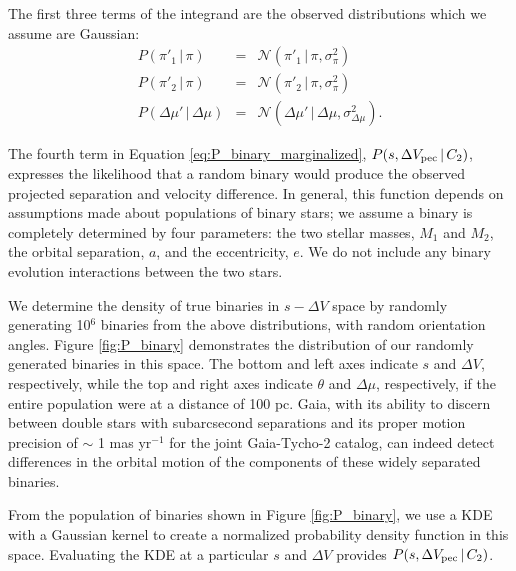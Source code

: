 \documentclass[usenatbib]{mnras}
\newcommand{\given}{\,|\,}
\begin{document}
The first three terms of the integrand are the observed distributions which we assume are Gaussian:
\begin{eqnarray}
P(\pi'_1 \given \pi) &=& \mathcal{N}(\pi'_1 \given \pi, \sigma^2_{\pi}) \\
P(\pi'_2 \given \pi) &=& \mathcal{N}(\pi'_2 \given \pi, \sigma^2_{\pi}) \\
P(\Delta \mu' \given \Delta \mu) &=& \mathcal{N}( \Delta \mu' \given \Delta \mu, \sigma^2_{\Delta \mu} ).
\end{eqnarray}



The fourth term in Equation \ref{eq:P_binary_marginalized}, $P(s, \Delta V_{\rm pec} \given C_2)$, expresses the likelihood that a random binary would produce the observed projected separation and velocity difference. In general, this function depends on assumptions made about populations of binary stars; we assume a binary is completely determined by four parameters: the two stellar masses, $M_1$ and $M_2$, the orbital separation, $a$, and the eccentricity, $e$. We do not include any binary evolution interactions between the two stars. 


We determine the density of true binaries in $s-\Delta V$ space by randomly generating 10$^6$ binaries from the above distributions, with random orientation angles. Figure \ref{fig:P_binary} demonstrates the distribution of our randomly generated binaries in this space. The bottom and left axes indicate $s$ and $\Delta V$, respectively, while the top and right axes indicate $\theta$ and $\Delta \mu$, respectively, if the entire population were at a distance of 100 pc. Gaia, with its ability to discern between double stars with subarcsecond separations and its proper motion precision of $\sim$ 1 mas yr$^{-1}$ for the joint Gaia-Tycho-2 catalog, can indeed detect differences in the orbital motion of the components of these widely separated binaries.


From the population of binaries shown in Figure \ref{fig:P_binary}, we use a KDE with a Gaussian kernel to create a normalized probability density function in this space. Evaluating the KDE at a particular $s$ and $\Delta V$ provides $P(s, \Delta V_{\rm pec} \given C_2)$.
\end{document}
